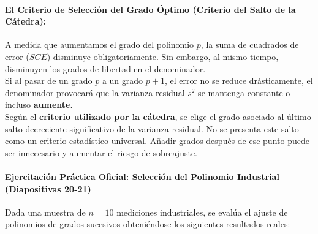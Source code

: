 \documentclass[11pt,letterpaper]{article}
\begin{document}
\paragraph{El Criterio de Selección del Grado Óptimo (Criterio del Salto de la Cátedra):}
A medida que aumentamos el grado del polinomio $p$, la suma de cuadrados de error ($SCE$) disminuye obligatoriamente. Sin embargo, al mismo tiempo, disminuyen los grados de libertad en el denominador. \\
Si al pasar de un grado $p$ a un grado $p+1$, el error no se reduce drásticamente, el denominador provocará que la varianza residual $s^2$ se mantenga constante o incluso \textbf{aumente}. \\
Según el \textbf{criterio utilizado por la cátedra}, se elige el grado asociado al último salto decreciente significativo de la varianza residual. No se presenta este salto como un criterio estadístico universal. Añadir grados después de ese punto puede ser innecesario y aumentar el riesgo de sobreajuste.

\paragraph{Ejercitación Práctica Oficial: Selección del Polinomio Industrial (Diapositivas 20-21)}
Dada una muestra de $n = 10$ mediciones industriales, se evalúa el ajuste de polinomios de grados sucesivos obteniéndose los siguientes resultados reales:

\begin{table}[htbp]
    \centering
    \caption{Selección de Grado Óptimo de Polinomio según Varianza Residual.}
    \label{tab:varianza_residual}
\end{table}
\end{document}
